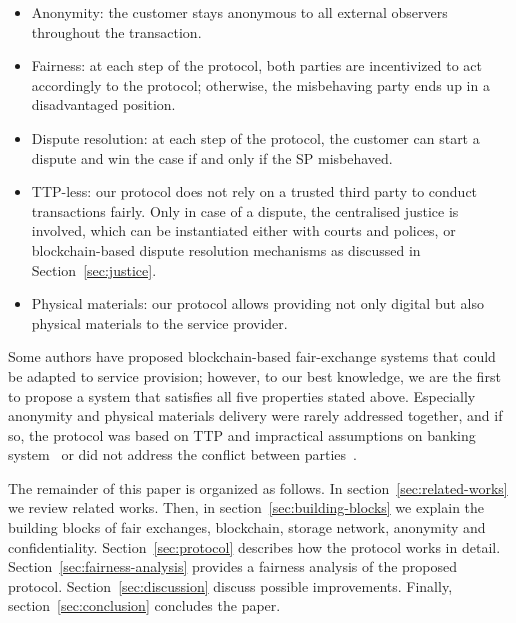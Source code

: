 \documentclass{ieeeaccess}
\begin{document}
\begin{itemize}
\item Anonymity: the customer stays anonymous to all external observers throughout the transaction.
\item Fairness: at each step of the protocol, both parties are incentivized to act accordingly to the protocol; otherwise, the misbehaving party ends up in a disadvantaged position.
\item Dispute resolution: at each step of the protocol, the customer can start a dispute and win the case if and only if the SP misbehaved.

\item TTP-less: 
our protocol does not rely on a trusted third party to conduct transactions fairly. Only in case of a dispute, the centralised justice is involved, which can be instantiated either with courts and polices, or blockchain-based dispute resolution mechanisms as discussed in Section~\ref{sec:justice}.
\item Physical materials: our protocol allows providing not only digital but also physical materials to the service provider.
\end{itemize} 

Some authors have proposed blockchain-based fair-exchange systems that could be adapted to service provision; however, to our best knowledge, we are the first to propose a system that satisfies all five properties stated above. Especially anonymity and physical materials delivery were rarely addressed together, and if so, the protocol was based on TTP and impractical assumptions on banking system~\cite{birjoveanuAnonymityFairexchangeEcommerce2015} or did not address the conflict between parties~\cite{altawyLelantosBlockchainBasedAnonymous2017}.


The remainder of this paper is organized as follows.
In section~\ref{sec:related-works} we review related works. 
Then, in section~\ref{sec:building-blocks} we explain the building blocks of fair exchanges, blockchain, storage network, anonymity and confidentiality.
Section~\ref{sec:protocol} describes how the protocol works in detail.
Section~\ref{sec:fairness-analysis} provides a fairness analysis of the proposed protocol.
Section~\ref{sec:discussion} discuss possible improvements. 
Finally, section~\ref{sec:conclusion} concludes the paper.
\end{document}
